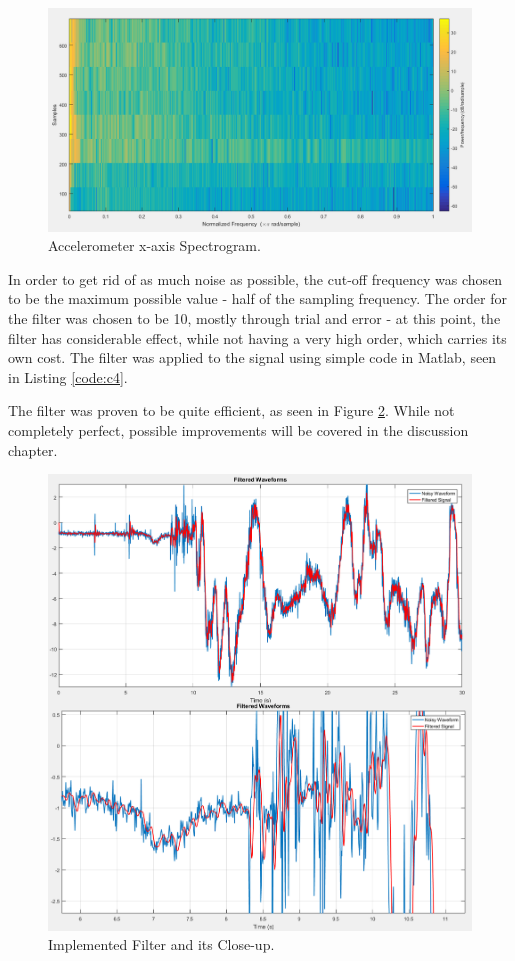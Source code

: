 \begin{figure}[H]
  \centering
    \includegraphics[width=1\textwidth]{images/spectrogram.png}
	\caption{Accelerometer x-axis Spectrogram.}
	\label{spectrogram}
\end{figure}

In order to get rid of as much noise as possible, the cut-off frequency was chosen to be the maximum possible value - half of the sampling frequency. The order for the filter was chosen to be 10, mostly through trial and error - at this point, the filter has considerable effect, while not having a very high order, which carries its own cost. The filter was applied to the signal using simple code in Matlab, seen in Listing \ref{code:c4}.



The filter was proven to be quite efficient, as seen in Figure \ref{accelFilter}. While not completely perfect, possible improvements will be covered in the discussion chapter.

\begin{figure}[H]
  \centering
    \includegraphics[width=1\textwidth]{images/accelFilter.png}
	\caption{Implemented Filter and its Close-up.}
	\label{accelFilter}
\end{figure}